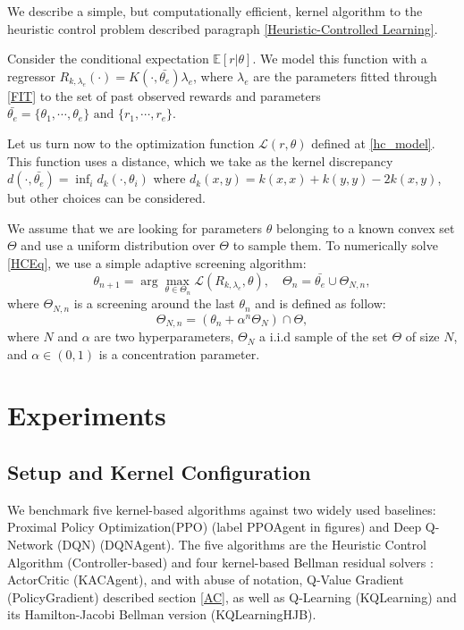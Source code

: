 \documentclass[
]{article}
\numberwithin{equation}{section}
\begin{document}
We describe a simple, but computationally efficient, kernel algorithm to the heuristic control problem described paragraph \ref{Heuristic-Controlled Learning}.

Consider the conditional expectation $\mathbb{E}[r|\theta]$. We model this function with a regressor $R_{k,\lambda_e}(\cdot) = K(\cdot, \bar{\theta_e})\lambda_e$, where $\lambda_e$ are the parameters fitted through \eqref{FIT} to the set of past observed rewards and parameters $\bar{\theta_e} = \{\theta_1, \cdots, \theta_e\} \text{ and } \{r_1, \cdots, r_e \}$.  

Let us turn now to the optimization function $\mathcal{L}(r,\theta)$ defined at \ref{hc_model}. This function uses a distance, which we take as the kernel discrepancy $d(\cdot, \bar{\theta_e})=\inf_i d_k(\cdot, \theta_i)$ where $d_k(x, y) = k(x,x)+k(y,y)-2k(x,y)$, but other choices can be considered. 

We assume that we are looking for parameters $\theta$ belonging to a known convex set $\Theta$ and use a uniform distribution over $\Theta$ to sample them. To numerically solve \eqref{HCEq}, we use a simple adaptive screening algorithm:
\begin{equation}
\theta_{n+1} = \arg \max_{\theta \in \Theta_n} \mathcal{L}(R_{k,\lambda_e},\theta), \quad \Theta_{n} = \bar{\theta_e} \cup \Theta_{N,n},
\end{equation}where $\Theta_{N,n}$ is a screening around the last $\theta_n$ and is defined as follow: 
\begin{equation}
\Theta_{N,n} = (\theta_n+\alpha^n \Theta_N) \cap \Theta,
\end{equation} where $N$ and $\alpha$ are two hyperparameters, $\Theta_N$ a i.i.d sample of the set $\Theta$ of size $N$, and $\alpha \in (0,1)$ is a concentration parameter.

\section{Experiments}\label{Experiments}
\subsection{Setup and Kernel Configuration}
We benchmark five kernel-based algorithms against two widely used baselines: Proximal Policy Optimization(PPO) \cite{PPO} (label PPOAgent in figures) and Deep Q-Network (DQN) \cite{DQN} (DQNAgent). The five algorithms are the Heuristic Control Algorithm (Controller-based) and four kernel-based Bellman residual solvers : ActorCritic (KACAgent), and with abuse of notation, Q-Value Gradient (PolicyGradient) described section \ref{AC}, as well as Q-Learning (KQLearning) and its Hamilton-Jacobi Bellman version (KQLearningHJB).
\end{document}
